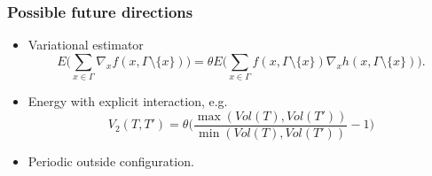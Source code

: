 \documentclass[c, 10pt]{beamer}
\begin{document}
\begin{frame}\frametitle{Possible future directions}
\begin{itemize}
\item Variational estimator
$$E \Bigg( \sum_{x \in \Gamma} \nabla_x f(x, \Gamma \setminus \{x\} ) \Bigg) = \theta E \Bigg(\sum_{x \in \Gamma} f(x, \Gamma \setminus \{x\}) \nabla_x h(x, \Gamma \setminus \{x\}) \Bigg).$$
\item Energy with explicit interaction, e.g.
$$V_2(T,T') = \theta \bigg (\frac {\max ( Vol(T), Vol(T'))}{\min(Vol(T),Vol(T'))} - 1\bigg)$$
\item Periodic outside configuration.

\end{itemize}
\end{frame}



\end{document}
